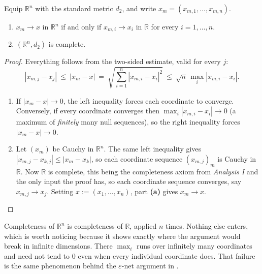 \begin{proposition}
\label{prop:Rn_coordinatewise_complete}
Equip $\mathbb{R}^n$ with the standard metric $d_2$, and write
$x_m = (x_{m,1},\dots,x_{m,n})$.
\begin{enumerate}[label=\textbf{(\alph*)}]
  \item $x_m \to x$ in $\mathbb{R}^n$ if and only if $x_{m,i} \to x_i$ in $\mathbb{R}$ for every
    $i = 1,\dots,n$.
  \item $(\mathbb{R}^n, d_2)$ is complete.
\end{enumerate}
\end{proposition}

\begin{proof}
Everything follows from the two-sided estimate, valid for every $j$:
\[|x_{m,j}-x_j| \ \leq\ |x_m-x| \ =\ \sqrt{\sum_{i=1}^n|x_{m,i}-x_i|^2}
  \ \leq\ \sqrt{n}\,\max_i|x_{m,i}-x_i|.\]

\begin{enumerate}[label=\textbf{(\alph*)}]
  \item If $|x_m-x| \to 0$, the left inequality forces each coordinate to
    converge. Conversely, if every coordinate converges then $\max_i|x_{m,i}-x_i| \to 0$ (a
    maximum of \emph{finitely} many null sequences), so the right inequality forces
    $|x_m - x| \to 0$.
  \item Let $(x_m)$ be Cauchy in $\mathbb{R}^n$. The same left inequality gives
    $|x_{m,j}-x_{k,j}| \leq |x_m-x_k|$, so each coordinate sequence $(x_{m,j})_m$ is
    Cauchy in $\mathbb{R}$. Now $\mathbb{R}$ is complete, this being the completeness axiom from
    \emph{Analysis I} and the only input the proof has, so each coordinate sequence converges,
    say $x_{m,j} \to x_j$. Setting $x := (x_1,\dots,x_n)$, part \textbf{(a)} gives $x_m \to x$.
\end{enumerate}
\end{proof}

\begin{remark}
Completeness of $\mathbb{R}^n$ is completeness of $\mathbb{R}$, applied $n$ times. Nothing else
enters, which is worth noticing because it shows exactly where the argument would break in
infinite dimensions. There $\max_i$ runs over infinitely many coordinates and need not tend to
$0$ even when every individual coordinate does. That failure is the same phenomenon behind the
$\varepsilon$-net argument in .
\end{remark}


